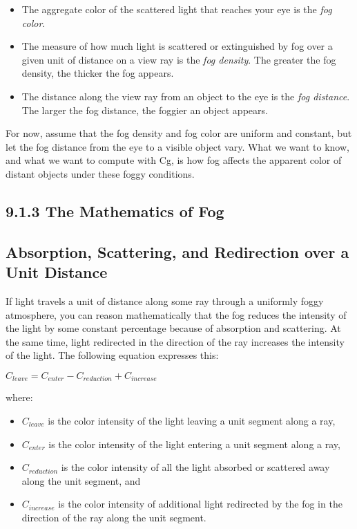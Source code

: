 \documentclass[../main.tex]{subfiles}
\begin{document}
\begin{itemize}
\item The aggregate color of the scattered light that reaches your eye is the \textit{fog color}.
\item The measure of how much light is scattered or extinguished by fog over a given unit of distance on a view ray is the \textit{fog density}. The greater the fog density, the thicker the fog appears.
\item The distance along the view ray from an object to the eye is the \textit{fog distance}. The larger the fog distance, the foggier an object appears.
\end{itemize}

For now, assume that the fog density and fog color are uniform and constant, but let the fog distance from the eye to a visible object vary. What we want to know, and what we want to compute with Cg, is how fog affects the apparent color of distant objects under these foggy conditions.

\subsection{9.1.3 The Mathematics of Fog}

\subsection*{Absorption, Scattering, and Redirection over a Unit Distance}

If light travels a unit of distance along some ray through a uniformly foggy atmosphere, you can reason mathematically that the fog reduces the intensity of the light by some constant percentage because of absorption and scattering. At the same time, light redirected in the direction of the ray increases the intensity of the light. The following equation expresses this:

\FloatBarrier
$
C_{leave}=C_{enter}-C_{reduction}+C_{increase}
$
\FloatBarrier

where:

\begin{itemize}
\item $C_{leave}$ is the color intensity of the light leaving a unit segment along a ray,
\item $C_{enter}$ is the color intensity of the light entering a unit segment along a ray,
\item $C_{reduction}$ is the color intensity of all the light absorbed or scattered away along the unit segment, and
\item $C_{increase}$ is the color intensity of additional light redirected by the fog in the direction of the ray along the unit segment.
\end{itemize}
\end{document}
